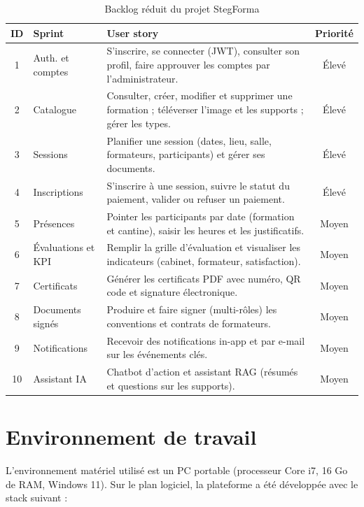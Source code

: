 \documentclass[12pt,a4paper]{report}
\begin{document}
\begin{table}[h]
\centering
\begin{tabular}{|c|p{3.4cm}|p{8.3cm}|c|}
\hline
\textbf{ID} & \textbf{Sprint} & \textbf{User story} & \textbf{Priorité} \\
\hline
1 & Auth. et comptes & S'inscrire, se connecter (JWT), consulter son profil, faire approuver les comptes par l'administrateur. & Élevé \\
\hline
2 & Catalogue & Consulter, créer, modifier et supprimer une formation ; téléverser l'image et les supports ; gérer les types. & Élevé \\
\hline
3 & Sessions & Planifier une session (dates, lieu, salle, formateurs, participants) et gérer ses documents. & Élevé \\
\hline
4 & Inscriptions & S'inscrire à une session, suivre le statut du paiement, valider ou refuser un paiement. & Élevé \\
\hline
5 & Présences & Pointer les participants par date (formation et cantine), saisir les heures et les justificatifs. & Moyen \\
\hline
6 & Évaluations et KPI & Remplir la grille d'évaluation et visualiser les indicateurs (cabinet, formateur, satisfaction). & Moyen \\
\hline
7 & Certificats & Générer les certificats PDF avec numéro, QR code et signature électronique. & Moyen \\
\hline
8 & Documents signés & Produire et faire signer (multi-rôles) les conventions et contrats de formateurs. & Moyen \\
\hline
9 & Notifications & Recevoir des notifications in-app et par e-mail sur les événements clés. & Moyen \\
\hline
10 & Assistant IA & Chatbot d'action et assistant RAG (résumés et questions sur les supports). & Moyen \\
\hline
\end{tabular}
\caption{Backlog réduit du projet StegForma}
\label{tab:backlog}
\end{table}

\section{Environnement de travail}

L'environnement matériel utilisé est un PC portable (processeur Core i7, 16 Go de RAM, Windows 11). Sur le plan logiciel, la plateforme a été développée avec le stack suivant :
\end{document}
